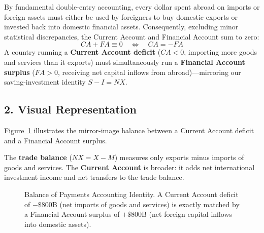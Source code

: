 \documentclass[11pt,letterpaper]{article}
\begin{document}
By fundamental double-entry accounting, every dollar spent abroad on imports or foreign assets must either be used by foreigners to buy domestic exports or invested back into domestic financial assets. Consequently, excluding minor statistical discrepancies, the Current Account and Financial Account sum to zero:
\begin{equation}
CA + FA \equiv 0 \quad \Longleftrightarrow \quad CA = -FA
\end{equation}
A country running a \textbf{Current Account deficit} ($CA < 0$, importing more goods and services than it exports) must simultaneously run a \textbf{Financial Account surplus} ($FA > 0$, receiving net capital inflows from abroad)—mirroring our saving-investment identity $S - I = NX$.

\subsection*{2. Visual Representation}
Figure~\ref{fig:bop_identity_diagram} illustrates the mirror-image balance between a Current Account deficit and a Financial Account surplus.

\begin{tcolorbox}[colback=yellow!10!white,colframe=orange!80!black,title=\textbf{Clear It Up: Trade Balance vs. Current Account}]
The \textbf{trade balance} ($NX = X - M$) measures only exports minus imports of goods and services. The \textbf{Current Account} is broader: it adds net international investment income and net transfers to the trade balance.
\end{tcolorbox}

\begin{figure}[htbp]
\centering
{}
\caption{Balance of Payments Accounting Identity. A Current Account deficit of $-\$800\text{B}$ (net imports of goods and services) is exactly matched by a Financial Account surplus of $+\$800\text{B}$ (net foreign capital inflows into domestic assets).}
\label{fig:bop_identity_diagram}
\end{figure}
\end{document}
